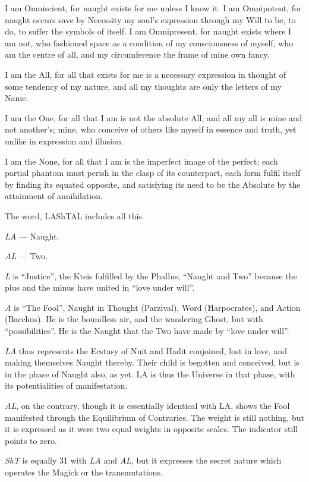 I am Omniscient, for naught exists for me unless I know it. I am Omnipotent, for naught occurs save by Necessity my soul's expression through my Will to be, to do, to suffer the symbols of itself. I am Omnipresent, for naught exists where I am not, who fashioned space as a condition of my consciousness of myself, who am the centre of all, and my circumference the frame of mine own fancy.

I am the All, for all that exists for me is a necessary expression in thought of some tendency of my nature, and all my thoughts are only the letters of my Name.

I am the One, for all that I am is not the absolute All, and all my all is mine and not another's; mine, who conceive of others like myself in essence and truth, yet unlike in expression and illusion.

I am the None, for all that I am is the imperfect image of the perfect; each partial phantom must perish in the clasp of its counterpart, each form fulfil itself by finding its equated opposite, and satisfying its need to be the Absolute by the attainment of annihilation.

The word, LAShTAL includes all this.

\textit{LA} --- Naught.

\textit{AL} --- Two.

\textit{L} is \enquote{Justice}, the Kteis fulfilled by the Phallus, \enquote{Naught and Two} because the plus and the minus have united in \enquote{love under will}.

\textit{A} is \enquote{The Fool}, Naught in Thought (Parzival), Word (Harpocrates), and Action (Bacchus). He is the boundless air, and the wandering Ghost, but with \enquote{possibilities}. He is the Naught that the Two have made by \enquote{love under will}.

\textit{LA} thus represents the Ecstasy of Nuit and Hadit conjoined, lost in love, and making themselves Naught thereby. Their child is begotten and conceived, but is in the phase of Naught also, as yet. LA is thus the Universe in that phase, with its potentialities of manifestation.

\textit{AL}, on the contrary, though it is essentially identical with LA, shows the Fool manifested through the Equilibrium of Contraries. The weight is still nothing, but it is expressed as it were two equal weights in opposite scales. The indicator still points to zero.

\textit{ShT} is equally 31 with \textit{LA} and \textit{AL}, but it expresses the secret nature which operates the Magick or the transmutations.

